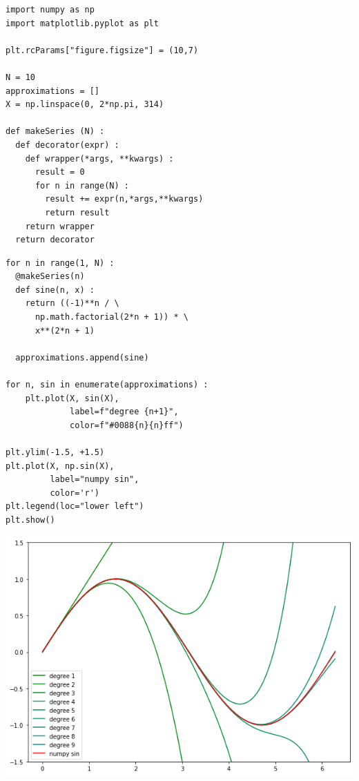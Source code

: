 
\begin{frame}[fragile]
%
\begin{tcbraster}[raster columns=2,
                  raster equal height,
                  nobeforeafter,
                  raster column skip=0.2cm]
\begin{codebox}
\begin{verbatim}
import numpy as np
import matplotlib.pyplot as plt

plt.rcParams["figure.figsize"] = (10,7)

N = 10
approximations = []
X = np.linspace(0, 2*np.pi, 314)

def makeSeries (N) :
  def decorator(expr) :
    def wrapper(*args, **kwargs) :
      result = 0
      for n in range(N) :
        result += expr(n,*args,**kwargs)
        return result
    return wrapper
  return decorator
\end{verbatim}
\end{codebox}
%
\begin{codebox}[... continued]
\begin{verbatim}
for n in range(1, N) :
  @makeSeries(n)
  def sine(n, x) :
    return ((-1)**n / \
      np.math.factorial(2*n + 1)) * \
      x**(2*n + 1)
    
  approximations.append(sine)

for n, sin in enumerate(approximations) :
    plt.plot(X, sin(X),
             label=f"degree {n+1}",
             color=f"#0088{n}{n}ff")

plt.ylim(-1.5, +1.5)
plt.plot(X, np.sin(X),
         label="numpy sin",
         color='r')
plt.legend(loc="lower left")
plt.show()
\end{verbatim}
\end{codebox}
\end{tcbraster}
%
\end{frame}


\begin{frame}
%
\begin{tcolorbox}[title=Output: Sine Series]
\begin{center}
	\includegraphics[width=.7\linewidth]{./gfx/sin-taylor}
\end{center}
\end{tcolorbox}
%
\end{frame}

